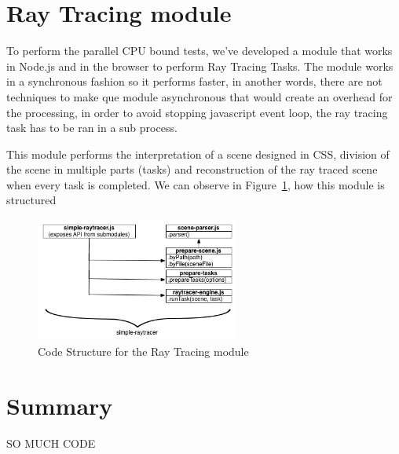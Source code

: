 \section{Ray Tracing module}

To perform the parallel CPU bound tests, we've developed a module that works in Node.js and in the browser to perform Ray Tracing Tasks. The module works in a synchronous fashion so it performs faster, in another words, there are not techniques to make que module asynchronous that would create an overhead for the processing, in order to avoid stopping javascript event loop, the ray tracing task has to be ran in a sub process.

This module performs the interpretation of a scene designed in CSS, division of the scene in multiple parts (tasks) and reconstruction of the ray traced scene when every task is completed. We can observe in Figure~\ref{fig:d-s-r}, how this module is structured

\begin{figure}[h!]
  \centering
  \includegraphics[width=0.6\textwidth]{figs/diagram-simple-raytracer}
  \caption{Code Structure for the Ray Tracing module}
  \label{fig:d-s-r}
\end{figure}

\section{Summary}

SO MUCH CODE
